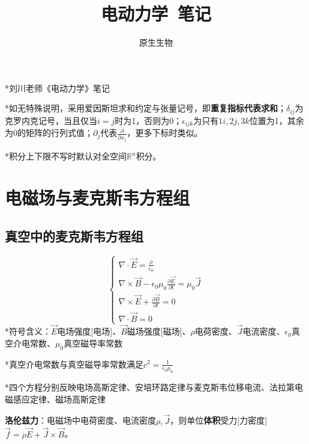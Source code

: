 \documentclass[a4paper,UTF8,fontset=windows]{ctexart}
\title{\textbf{电动力学\ 笔记}}
\author{原生生物}
\date{}
\newcommand*{\vb}{\vec{B}}
\newcommand*{\ve}{\vec{E}}
\newcommand*{\vj}{\vec{J}}
\newcommand*{\pt}[2][t]{\frac{\partial #2}{\partial #1}}
\begin{document}
\maketitle

*刘川老师《电动力学》笔记

*如无特殊说明，采用爱因斯坦求和约定与张量记号，即\textbf{重复指标代表求和}；$\delta_{ij}$为克罗内克记号，当且仅当$i=j$时为1，否则为0；$\epsilon_{ijk}$为只有$1i,2j,3k$位置为1，其余为0的矩阵的行列式值；$\partial_j$代表$\frac{\partial}{\partial x_j}$，更多下标时类似。

*积分上下限不写时默认对全空间$\mathbb{R}^n$积分。

\tableofcontents

\newpage
\section{电磁场与麦克斯韦方程组}
\subsection{真空中的麦克斯韦方程组}
$$\begin{cases}
    \nabla\cdot\ve=\frac{\rho}{\epsilon_0}\\
    \nabla\times\vb-\epsilon_0\mu_0\pt{\ve}=\mu_0\vj\\
    \nabla\times\ve+\pt{\vb}=0\\
    \nabla\cdot\vb=0
\end{cases}$$
*符号含义：$\ve$电场强度[电场]、$\vb$磁场强度[磁场]、$\rho$电荷密度、$\vj$电流密度、$\epsilon_0$真空介电常数、$\mu_0$真空磁导率常数

*真空介电常数与真空磁导率常数满足$c^2=\frac{1}{\epsilon_0\mu_0}$

*四个方程分别反映电场高斯定律、安培环路定律与麦克斯韦位移电流、法拉第电磁感应定律、磁场高斯定律

\textbf{洛伦兹力}：电磁场中电荷密度、电流密度$\rho,\vj$，则单位\textbf{体积}受力[力密度]$\vec{f}=\rho\ve+\vj\times\vb$。
\end{document}
